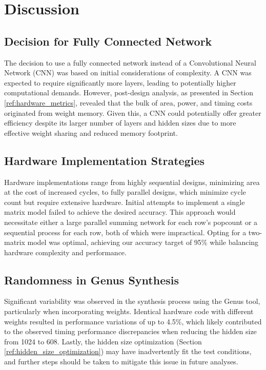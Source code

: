 \documentclass[conference]{IEEEtran}
\begin{document}
\section{Discussion}
\label{sec:discussion}

\subsection{Decision for Fully Connected Network}

The decision to use a fully connected network instead of a Convolutional Neural Network (CNN) was based on initial considerations of complexity. A CNN was expected to require significantly more layers, leading to potentially higher computational demands. However, post-design analysis, as presented in Section \ref{ref:hardware_metrics}, revealed that the bulk of area, power, and timing costs originated from weight memory. Given this, a CNN could potentially offer greater efficiency despite its larger number of layers and hidden sizes due to more effective weight sharing and reduced memory footprint.

\subsection{Hardware Implementation Strategies}

Hardware implementations range from highly sequential designs, minimizing area at the cost of increased cycles, to fully parallel designs, which minimize cycle count but require extensive hardware. Initial attempts to implement a single matrix model failed to achieve the desired accuracy. This approach would necessitate either a large parallel summing network for each row's popcount or a sequential process for each row, both of which were impractical. Opting for a two-matrix model was optimal, achieving our accuracy target of 95\% while balancing hardware complexity and performance.

\subsection{Randomness in Genus Synthesis}

Significant variability was observed in the synthesis process using the Genus \cite{genus} tool, particularly when incorporating weights. Identical hardware code with different weights resulted in performance variations of up to 4.5\%, which likely contributed to the observed timing performance discrepancies when reducing the hidden size from 1024 to 608. Lastly, the hidden size optimization (Section \ref{ref:hidden_size_optimization}) may have inadvertently fit the test conditions, and further steps should be taken to mitigate this issue in future analyses.
\end{document}
